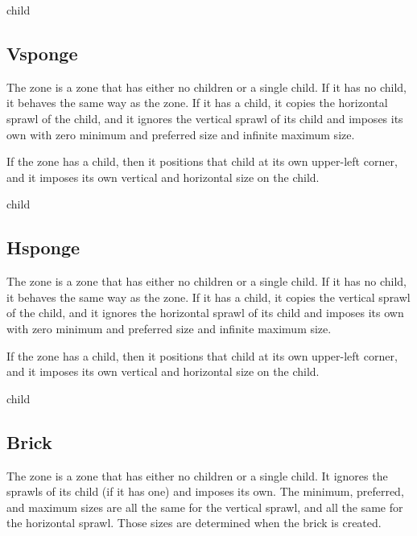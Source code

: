 
 {\optional child}

\subsection{Vsponge}
\label{sec-zones-layout-vsponge}

The  zone is a zone that has either no children or a
single child.  If it has no child, it behaves the same way as the
 zone.   If it has a
child, it copies the horizontal sprawl of the child, and it ignores
the vertical sprawl of its child and imposes its own with zero minimum
and preferred size and infinite maximum size.

If the  zone has a child, then it positions that child
at its own upper-left corner, and it imposes its own vertical and
horizontal size on the child.


 {\optional child}

\subsection{Hsponge}
\label{sec-zones-layout-hsponge}

The  zone is a zone that has either no children or a single
child.  If it has no child, it behaves the same way as the
 zone.   If it has a
child, it copies the vertical sprawl of the child, and it ignores
the horizontal sprawl of its child and imposes its own with zero minimum
and preferred size and infinite maximum size.

If the  zone has a child, then it positions that child
at its own upper-left corner, and it imposes its own vertical and
horizontal size on the child.


 {\optional child}

\subsection{Brick}
\label{sec-zones-layout-brick}

The  zone is a zone that has either no children or a
single child.  It ignores the sprawls of its child (if it has one) and
imposes its own.  The minimum, preferred, and maximum sizes are all
the same for the vertical sprawl, and all the same for the horizontal
sprawl.  Those sizes are determined when the brick is created.

